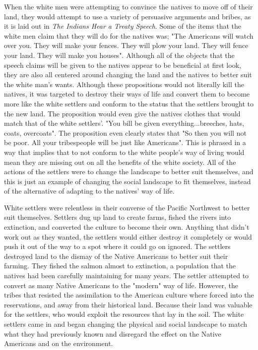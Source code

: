 \documentclass{article}
\begin{document}
When the white men were attempting to convince the natives to move off of their land, they would attempt to use a variety of persuasive arguments and bribes, as it is laid out in \textit{The Indians Hear a Treaty Speech}. Some of the items that the white men claim that they will do for the natives was; "The Americans will watch over you. They will make your fences. They will plow your land. They will fence your land. They will make you houses"\cite{VOH}. Although all of the objects that the speech claims will be given to the natives appear to be beneficial at first look, they are also all centered around changing the land and the natives to better suit the white man's wants. Although these propositions would not literally kill the natives, it was targeted to destroy their ways of life and convert them to become more like the white settlers and conform to the status that the settlers brought to the new land. The proposition would even give the natives clothes that would match that of the white settlers'. "You bill be given everything...breeches, hats, coats, overcoats"\cite{VOH}. The proposition even clearly states that "So then you will not be poor. All your tribespeople will be just like Americans"\cite{VOH}. This is phrased in a way that implies that to not conform to the white people's way of living would mean they are missing out on all the benefits of the white society. All of the actions of the settlers were to change the landscape to better suit themselves, and this is just an example of changing the social landscape to fit themselves, instead of the alternative of adapting to the natives' way of life.
\par
White settlers were relentless in their converse of the Pacific Northwest to better suit themselves. Settlers dug up land to create farms, fished the rivers into extinction, and converted the culture to become their own. Anything that didn't work out as they wanted, the settlers would either destroy it completely or would push it out of the way to a spot where it could go on ignored. The settlers destroyed land to the dismay of the Native Americans to better suit their farming. They fished the salmon almost to extinction, a population that the natives had been carefully maintaining for many years. The settler attempted to convert as many Native Americans to the "modern" way of life. However, the tribes that resisted the assimilation to the American culture where forced into the reservations, and away from their historical land. Because their land was valuable for the settlers, who would exploit the resources that lay in the soil. The white settlers came in and began changing the physical and social landscape to match what they had previously known and disregard the effect on the Native Americans and on the environment.
\newpage
\printbibliography
\end{document}
